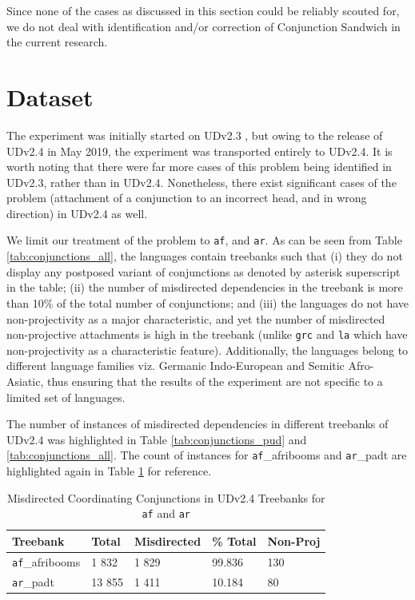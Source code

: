 Since none of the cases as discussed in this section could be reliably scouted for, we do not deal with identification and/or correction of Conjunction Sandwich in the current research.

\section{Dataset}
\label{ssec:conj_head_dataset}

The experiment was initially started on UDv2.3 \citep{UDv2.3}, but owing to the release of UDv2.4 \citep{UDv2.4} in May 2019, the experiment was transported entirely to UDv2.4. It is worth noting that there were far more cases of this problem being identified in UDv2.3, rather than in UDv2.4. Nonetheless, there exist significant cases of the problem (attachment of a conjunction to an incorrect head, and in wrong direction) in UDv2.4 as well.

We limit our treatment of the problem to \verb|af|, and \verb|ar|. As can be seen from Table \ref{tab:conjunctions_all}, the languages contain treebanks such that (i) they do not display any postposed variant of conjunctions as denoted by asterisk superscript in the table; (ii) the number of misdirected dependencies in the treebank is more than 10\% of the total number of conjunctions; and (iii) the languages do not have non-projectivity as a major characteristic, and yet the number of misdirected non-projective attachments is high in the treebank (unlike \verb|grc| and \verb|la| which have non-projectivity as a characteristic feature). Additionally, the languages belong to different language families viz. Germanic Indo-European and Semitic Afro-Asiatic, thus ensuring that the results of the experiment are not specific to a limited set of languages.

The number of instances of misdirected dependencies in different treebanks of UDv2.4 was highlighted in Table \ref{tab:conjunctions_pud} and \ref{tab:conjunctions_all}. The count of instances for \verb|af|\_afribooms and \verb|ar|\_padt are highlighted again in Table \ref{tab:dataset_conj} for reference.

\begin{table}[H]
    \centering
    \begin{tabular}{|l|l|l|l|l|}
        \hline
        \textbf{Treebank} & \textbf{Total} & \textbf{Misdirected} & \textbf{\% Total} & \textbf{Non-Proj}\\
        \hline
        \verb|af|\_afribooms & 1 832 & 1 829 & 99.836 & 130\\
        \verb|ar|\_padt & 13 855 & 1 411 & 10.184 & 80\\
        \hline
    \end{tabular}
    \caption{Misdirected Coordinating Conjunctions in UDv2.4 Treebanks for \texttt{af} and \texttt{ar}}
    \label{tab:dataset_conj}
\end{table}

